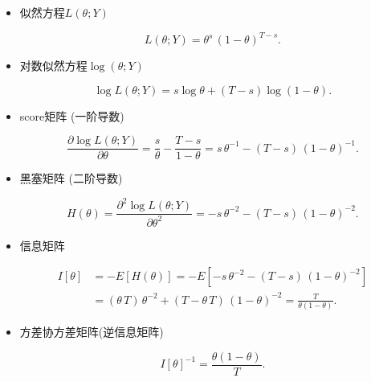 \begin{itemize}
\tightlist
\item
  似然方程\(L(\theta ; Y)\)

  \begin{equation}
  L(\theta ; Y) = \theta^{s} \, \left( 1 - \theta \right)^{T-s}.
  \end{equation}
\item
  对数似然方程\(\log (\theta ; Y)\)

  \begin{equation}
  \log L(\theta ; Y) = s \log \theta + \left( T - s \right) \log \left( 1 - \theta \right).
  \end{equation}
\item
  score矩阵 (一阶导数)

  \begin{equation}
  \frac{
  \partial \log L(\theta ; Y)
  }{
  \partial \theta
  }
  = \frac{s}{\theta} - \frac{T-s}{1-\theta} = s \, \theta^{-1} - \left(T - s \right) \, \left( 1 - \theta \right)^{-1}.
  \end{equation}
\item
  黑塞矩阵 (二阶导数)

  \begin{equation}
  H(\theta) = \frac{
  \partial^{2} \log L(\theta ; Y)
  }{
  \partial \theta^{2}
  } = - s \, \theta^{-2} - \left(T - s \right) \, \left( 1 - \theta \right)^{-2}.
  \end{equation}
\item
  信息矩阵

  \begin{equation}\begin{split}
  I[\theta] & = - E [H(\theta)] = - E \left[- s \, \theta^{-2} - \left(T - s \right) \, \left( 1 - \theta \right)^{-2} \right] \\
  & = \left( \theta \, T \right) \, \theta^{-2} + \left(T - \theta \, T \right) \, \left( 1 - \theta \right)^{-2}
  = \frac{T}{\theta (1-\theta) }.
  \end{split}\end{equation}
\item
  方差协方差矩阵(逆信息矩阵)

  \begin{equation}
  I[\theta]^{-1} = \frac{\theta (1-\theta) }{T}.
  \end{equation}
\end{itemize}

